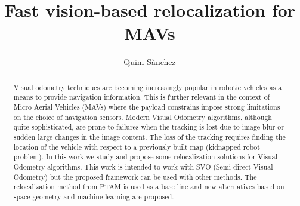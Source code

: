\documentclass[a4paper, 10pt, conference]{ieeeconf}      %
\title{\LARGE \bf
Fast vision-based relocalization for MAVs
}
\author{Quim S\`{a}nchez}
\begin{document}
\maketitle
\thispagestyle{empty}
\pagestyle{empty}


\begin{abstract}

Visual odometry techniques are becoming increasingly popular in robotic vehicles as a means to provide navigation information. This is further relevant in the context of Micro Aerial Vehicles (MAVs) where the payload constrains impose strong limitations on the choice of navigation sensors.  
Modern Visual Odometry algorithms, although quite sophisticated, are prone to failures when the tracking is lost due to image blur or sudden large changes in the image content.  
The loss of the tracking requires finding the location of the vehicle with respect to a previously built map (kidnapped robot problem). In this work we study and propose some relocalization solutions for Visual Odometry algorithms. This work is intended to work with SVO (Semi-direct Visual Odometry) but the proposed framework can be used with other methods. The relocalization method from PTAM is used as a base line and new alternatives based on space geometry and machine learning are proposed.

\end{abstract}


















\end{document}

